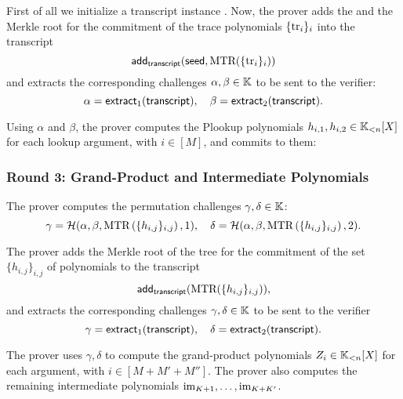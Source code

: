 \ifPOLYGON
First of all we initialize a transcript instance \transcript. Now, the prover adds the \seed and the Merkle root for the commitment of the trace polynomials $\{\text{tr}_i\}_i$ into the transcript
\[
	\textsf{add}_{\textsf{transcript}}(\textsf{seed}, \text{MTR}(\{\text{tr}_i\}_i))
\]
and extracts the corresponding challenges $\alpha, \beta \in \mathbb{K}$ to be sent to the verifier:
\[
\alpha = \mathsf{extract}_{1}(\textsf{transcript}), \quad \beta = \mathsf{extract}_{2}(\textsf{transcript}).
\]
\fi

Using $\alpha$ and $\beta$, the prover computes the Plookup polynomials $h_{i,1},h_{i,2} \in \mathbb{K}_{<n}[X]$ for each lookup argument, with $i \in [M]$, and commits to them:



\subsubsection*{Round 3: Grand-Product and Intermediate Polynomials}\label{par:round-3}

\ifNOPOLYGON
The prover computes the permutation challenges $\gamma,\delta \in \mathbb{K}$: 
\[
  \gamma = \mathcal{H}(\alpha,\beta,\text{MTR}\left(\{h_{i,j}\}_{i,j}\right),1),\quad \delta = \mathcal{H}(\alpha,\beta,\text{MTR}\left(\{h_{i,j}\}_{i,j}\right),2).
\]
\fi

\ifPOLYGON
The prover adds the Merkle root of the tree for the commitment of the set $\{h_{i, j}\}_{i, j}$ of polynomials to the transcript
\[
\textsf{add}_{\textsf{transcript}}(\text{MTR}(\{h_{i, j}\}_{i, j})),
\]
and extracts the corresponding challenges $\gamma, \delta \in \mathbb{K}$ to be sent to the verifier
\[
\gamma = \mathsf{extract}_{1}(\textsf{transcript}), \quad \delta = \mathsf{extract}_{2}(\textsf{transcript}).
\]
\fi

The prover uses $\gamma,\delta$ to compute the grand-product polynomials $Z_i \in \mathbb{K}_{<n}[X]$ for each argument, with $i \in [M+M'+M'']$. 
The prover also computes the remaining intermediate polynomials $\text{im}_{K+1},\dots,\text{im}_{K+K'}$. 

